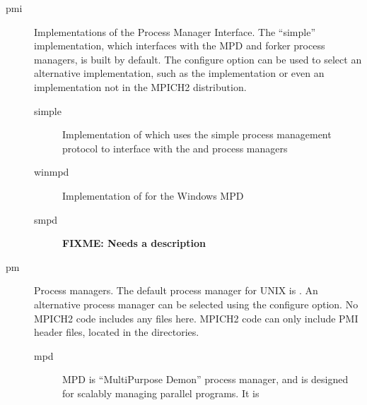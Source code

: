 \documentclass{article}
\def\fixme#1{\marginpar{FIXME:}\textbf{FIXME: #1}}
\begin{document}
\begin{description}
\begin{description}
  \item[pmi]Implementations of the Process Manager Interface.  The ``simple''
    implementation, which interfaces with the MPD and forker process managers,
    is built by default.   The configure option  can
    be used to select an alternative implementation, such as the 
    implementation or even
    an implementation not in the MPICH2 distribution.
    \begin{description}
          \item[simple]Implementation of  which uses the simple
            process management protocol to interface with the  and
             process managers
          \item[winmpd]Implementation of  for the Windows
          MPD
          \item[smpd]\fixme{Needs a description}
    \end{description}
    \item[pm]Process managers.  The default process manager for UNIX is
      .  An alternative process manager can be selected using the
       configure option.  No MPICH2 code includes
      any files here.  MPICH2 code can only include PMI header files,
      located in the  directories.
        \begin{description}
        \item[mpd]MPD is ``MultiPurpose Demon'' process manager, and
        is designed for scalably managing parallel programs.  It is

\end{description}
\end{description}
\end{description}
\end{document}
